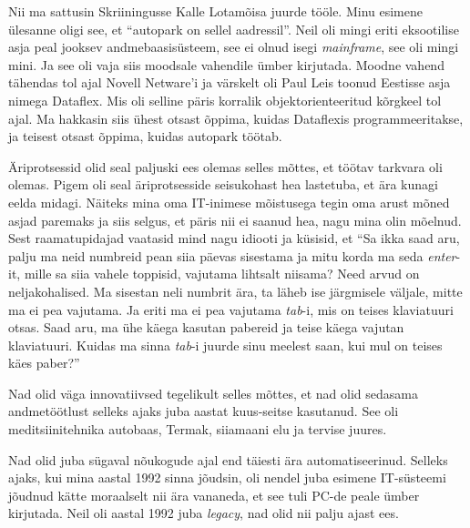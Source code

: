 Nii ma sattusin Skriiningusse Kalle Lotamõisa 
juurde 
tööle. Minu esimene ülesanne oligi see, et \enquote{autopark on sellel 
aadressil}. 
Neil oli mingi eriti eksootilise asja peal jooksev andmebaasisüsteem, see ei 
olnud isegi \emph{mainframe}, see oli mingi mini. Ja see oli vaja siis 
moodsale vahendile ümber kirjutada. Moodne vahend tähendas tol ajal Novell 
Netware'i ja värskelt oli Paul Leis toonud 
Eestisse asja nimega Dataflex. Mis oli selline päris 
 korralik objektorienteeritud kõrgkeel tol ajal. Ma hakkasin siis ühest otsast 
õppima, kuidas Dataflexis programmeeritakse, ja 
teisest otsast õppima, kuidas autopark töötab. 


Äriprotsessid olid seal paljuski ees olemas selles mõttes, et töötav tarkvara 
oli olemas. Pigem oli seal äriprotsesside seisukohast hea lastetuba, et ära 
kunagi eelda midagi. Näiteks mina oma IT-inimese mõistusega tegin  oma 
arust mõned asjad paremaks ja siis selgus, et päris nii ei saanud hea, nagu 
mina olin mõelnud. Sest raamatupidajad vaatasid mind nagu idiooti ja küsisid, 
et 
\enquote{Sa ikka saad aru, palju ma neid numbreid pean siia päevas sisestama 
ja mitu korda ma seda \emph{enter}-it, mille sa siia vahele toppisid,  vajutama 
lihtsalt niisama? Need arvud on neljakohalised. Ma sisestan neli numbrit ära, 
ta läheb ise järgmisele väljale, mitte ma ei pea vajutama. Ja eriti ma ei pea 
vajutama \emph{tab}-i, mis on teises klaviatuuri otsas. Saad aru, ma ühe käega 
kasutan 
pabereid ja teise käega vajutan klaviatuuri. Kuidas ma sinna \emph{tab}-i 
juurde sinu 
meelest saan, kui mul on teises käes paber?} 

Nad olid väga innovatiivsed tegelikult selles mõttes, et nad olid 
sedasama andmetöötlust selleks ajaks juba aastat kuus-seitse kasutanud. See oli 
 meditsiinitehnika autobaas, Termak, siiamaani elu ja tervise 
juures. 



Nad olid juba sügaval nõukogude ajal end täiesti ära automatiseerinud. Selleks 
ajaks, kui mina aastal 1992 sinna jõudsin, oli nendel juba esimene IT-süsteemi 
jõudnud kätte moraalselt nii ära vananeda, et see tuli PC-de peale ümber 
kirjutada. Neil oli aastal 1992 juba \emph{legacy}, nad olid nii palju ajast 
ees.


